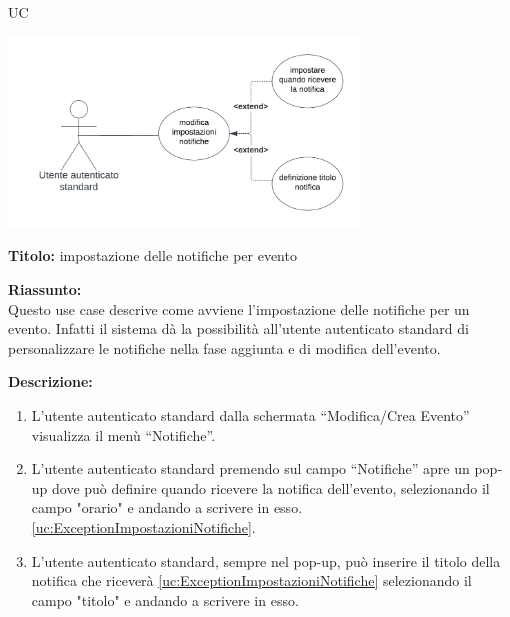 \begin{listaPersonale}{UC}






    \newpage


    \begin{center}
        \includegraphics[width=0.7\textwidth]{img/Diagrammi/UseCases/Notifiche.png}
    \end{center}

    \textbf{Titolo:} impostazione delle notifiche per evento

    \textbf{Riassunto:} \\
    Questo use case descrive come avviene l'impostazione delle notifiche per un evento. Infatti il sistema dà la possibilità all'utente autenticato standard di personalizzare le notifiche nella fase aggiunta e di modifica dell'evento.

    \textbf{Descrizione:}
    \begin{enumerate}
        \item L'utente autenticato standard dalla schermata “Modifica/Crea Evento” visualizza il menù “Notifiche”.
        \item L'utente autenticato standard premendo sul campo “Notifiche” apre un pop-up dove può definire quando ricevere la notifica dell'evento, selezionando il campo "orario" e andando a scrivere in esso. \ref{uc:ExceptionImpostazioniNotifiche}.
        \item L'utente autenticato standard, sempre nel pop-up, può inserire il titolo della notifica che riceverà \ref{uc:ExceptionImpostazioniNotifiche} selezionando il campo "titolo" e andando a scrivere in esso.
    \end{enumerate}


\end{listaPersonale}
